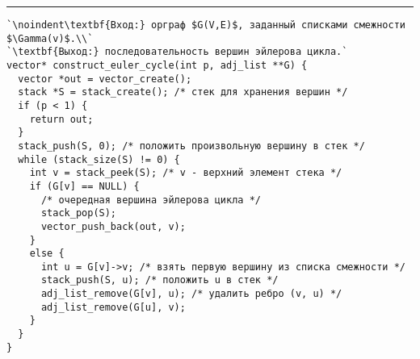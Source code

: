 \vspace{5pt} \hrule
\begin{lstlisting}[caption={Построение эйлерова цикла}, label=p341_euler_cycle, escapechar=`]
`\noindent\textbf{Вход:} орграф $G(V,E)$, заданный списками смежности $\Gamma(v)$.\\`
`\textbf{Выход:} последовательность вершин эйлерова цикла.`
vector* construct_euler_cycle(int p, adj_list **G) {
  vector *out = vector_create();
  stack *S = stack_create(); /* стек для хранения вершин */
  if (p < 1) {
    return out;
  }
  stack_push(S, 0); /* положить произвольную вершину в стек */
  while (stack_size(S) != 0) {
    int v = stack_peek(S); /* v - верхний элемент стека */
    if (G[v] == NULL) {
      /* очередная вершина эйлерова цикла */
      stack_pop(S);
      vector_push_back(out, v);
    }
    else {
      int u = G[v]->v; /* взять первую вершину из списка смежности */
      stack_push(S, u); /* положить u в стек */
      adj_list_remove(G[v], u); /* удалить ребро (v, u) */
      adj_list_remove(G[u], v);
    }
  }
}
\end{lstlisting}
